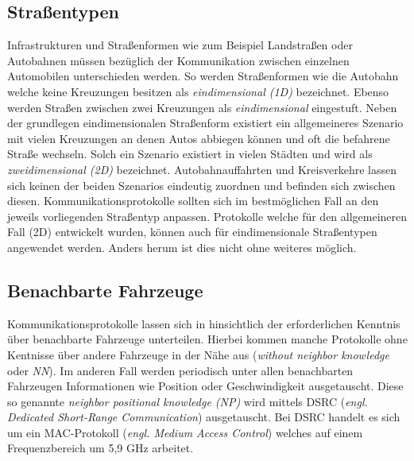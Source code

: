 \documentclass[english,runningheads,a4paper]{llncs}[2018/03/10]
\begin{document}
\subsection{Straßentypen}
Infrastrukturen und Straßenformen wie zum Beispiel Landstraßen oder Autobahnen müssen bezüglich der Kommunikation zwischen einzelnen Automobilen unterschieden werden.
So werden Straßenformen wie die Autobahn welche keine Kreuzungen besitzen als \textit{eindimensional (1D)} bezeichnet.
Ebenso werden Straßen zwischen zwei Kreuzungen als \textit{eindimensional} eingestuft.
Neben der grundlegen eindimensionalen Straßenform existiert ein allgemeineres Szenario mit vielen Kreuzungen an denen Autos abbiegen können und oft die befahrene Straße wechseln.
Solch ein Szenario existiert in vielen Städten und wird als \textit{zweidimensional (2D)} bezeichnet.
Autobahnauffahrten und Kreisverkehre lassen sich keinen der beiden Szenarios eindeutig zuordnen und befinden sich zwischen diesen.
Kommunikationsprotokolle sollten sich im bestmöglichen Fall an den jeweils vorliegenden Straßentyp anpassen.
Protokolle welche für den allgemeineren Fall (2D) entwickelt wurden, können auch für eindimensionale Straßentypen angewendet werden.
Anders herum ist dies nicht ohne weiteres möglich.

\subsection{Benachbarte Fahrzeuge}
Kommunikationsprotokolle lassen sich in hinsichtlich der erforderlichen Kenntnis über benachbarte Fahrzeuge unterteilen.
Hierbei kommen manche Protokolle ohne Kentnisse über andere Fahrzeuge in der Nähe aus (\textit{without neighbor knowledge} oder \textit{NN}).
Im anderen Fall werden periodisch unter allen benachbarten Fahrzeugen Informationen wie Position oder Geschwindigkeit ausgetauscht.
Diese so genannte \textit{neighbor positional knowledge (NP)} wird mittels DSRC (\textit{engl. Dedicated Short-Range Communication}) ausgetauscht.
Bei DSRC handelt es sich um ein MAC-Protokoll (\textit{engl. Medium Access Control}) welches auf einem Frequenzbereich um 5,9 GHz arbeitet.
\end{document}
